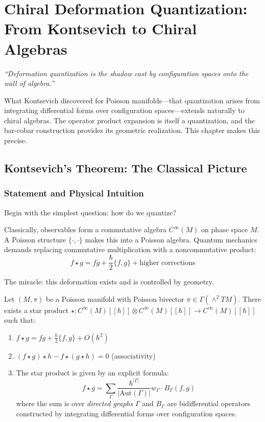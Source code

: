 \chapter{Chiral Deformation Quantization: From Kontsevich to Chiral Algebras}
\label{ch:chiral-deformation}
\label{chap:chiral-deformation}

\begin{remark}[Epigraph]
\textit{``Deformation quantization is the shadow cast by configuration spaces onto the wall of algebra.''} 

What Kontsevich discovered for Poisson manifolds—that quantization arises from integrating differential forms over configuration spaces—extends naturally to chiral algebras. The operator product expansion is itself a quantization, and the bar-cobar construction provides its geometric realization. This chapter makes this precise.
\end{remark}

\section{Kontsevich's Theorem: The Classical Picture}

\subsection{Statement and Physical Intuition}

Begin with the simplest question: how do we quantize?

Classically, observables form a commutative algebra $C^\infty(M)$ on phase space $M$. A Poisson structure $\{\cdot,\cdot\}$ makes this into a Poisson algebra. Quantum mechanics demands replacing commutative multiplication with a noncommutative product:
$$f \star g = fg + \frac{\hbar}{2}\{f,g\} + \text{higher corrections}$$

The miracle: this deformation exists and is controlled by geometry.

\begin{theorem}[Kontsevich 1997]
Let $(M, \pi)$ be a Poisson manifold with Poisson bivector $\pi \in \Gamma(\wedge^2 TM)$. There exists a star product $\star: C^\infty(M)[[\hbar]] \otimes C^\infty(M)[[\hbar]] \to C^\infty(M)[[\hbar]]$ such that:
\begin{enumerate}
\item $f \star g = fg + \frac{\hbar}{2}\{f,g\} + O(\hbar^2)$
\item $(f \star g) \star h - f \star (g \star h) = 0$ (associativity)
\item The star product is given by an explicit formula:
$$f \star g = \sum_{\Gamma} \frac{\hbar^{|\Gamma|}}{|\text{Aut}(\Gamma)|} w_\Gamma \cdot B_\Gamma(f,g)$$
where the sum is over \emph{directed graphs} $\Gamma$ and $B_\Gamma$ are bidifferential operators constructed by integrating differential forms over configuration spaces.
\end{enumerate}
\end{theorem}


